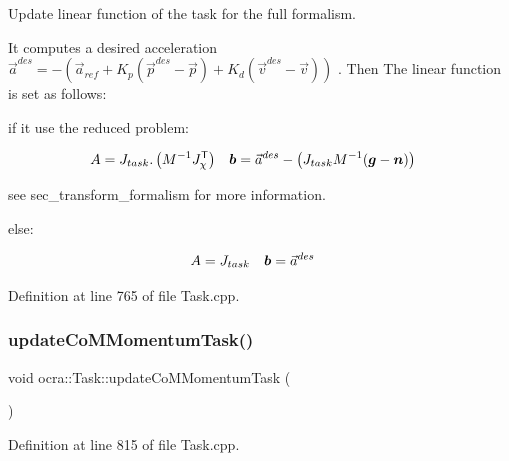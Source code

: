Update linear function of the task for the full formalism.

It computes a desired acceleration $ \vec{a}^{des} = - \left( \vec{a}_{ref} + K_p (\vec{p}^{des} - \vec{p}) + K_d (\vec{v}^{des} - \vec{v}) \right) $ . Then The linear function is set as follows\+:


\begin{DoxyItemize}
\item if it use the reduced problem\+:

\begin{align*} A &= J_{task} . \left( M^{-1} J_{\chi}^{\mathsf{T}} \right) & \mbox{\boldmath${b}$} &= \vec{a}^{des} - \left( J_{task} M^{-1} ( \mbox{\boldmath${g}$} - \mbox{\boldmath${n}$}) \right) \end{align*}
\end{DoxyItemize}

see sec\+\_\+transform\+\_\+formalism for more information.


\begin{DoxyItemize}
\item else\+:

\begin{align*} A &= J_{task} & \mbox{\boldmath${b}$} &= \vec{a}^{des} \end{align*} 
\end{DoxyItemize}

Definition at line 765 of file Task.\+cpp.

\hypertarget{classocra_1_1Task_a2cfddc40424cb0edd08defe5df48addf}{}\label{classocra_1_1Task_a2cfddc40424cb0edd08defe5df48addf} 
\subsubsection{\texorpdfstring{update\+Co\+M\+Momentum\+Task()}{updateCoMMomentumTask()}}
{\footnotesize\ttfamily void ocra\+::\+Task\+::update\+Co\+M\+Momentum\+Task (\begin{DoxyParamCaption}{ }\end{DoxyParamCaption})\hspace{0.3cm}{\ttfamily [protected]}}



Definition at line 815 of file Task.\+cpp.

\hypertarget{classocra_1_1Task_a49af52acac5f23a6fc51c071271ae6ea}{}\label{classocra_1_1Task_a49af52acac5f23a6fc51c071271ae6ea} 
